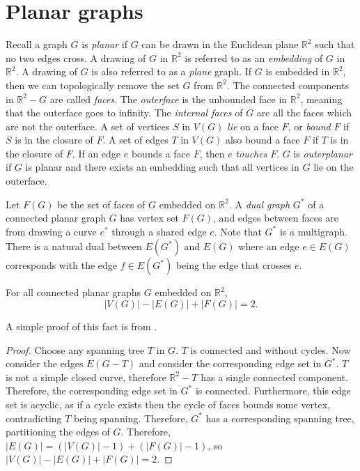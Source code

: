 \section{Planar graphs}\label{sec:Planar graphs}
Recall a graph \(G\) is \textit{planar} if \(G\) can be drawn in the Euclidean plane \( \mathbb{R}^2 \) such that no two edges cross. A drawing of $G$ in $\mathbb{R}^2$ is referred to as an \textit{embedding} of $G$ in $\mathbb{R}^2$. A drawing of $G$ is also referred to as a \textit{plane} graph. If \(G\) is embedded in \(\mathbb{R}^2 \), then we can topologically remove the set $G$ from $\mathbb{R}^2$. The connected components in $\mathbb{R}^2 - G$ are called \textit{faces}. The \textit{outerface} is the unbounded face in $\mathbb{R}^2$, meaning that the outerface goes to infinity. The \textit{internal faces} of $G$ are all the faces which are not the outerface. A set of vertices $S$ in $V(G)$ \textit{lie} on a face $F$, or \textit{bound} $F$ if $S$ is in the closure of $F$. A set of edges $T$ in $V(G)$ also bound a face $F$ if $T$ is in the closure of $F$. If an edge $e$ bounds a face $F$, then $e$ \textit{touches} $F$. \(G\) is \textit{outerplanar} if \(G\) is planar and there exists an embedding such that all vertices in \(G\) lie on the outerface.

Let \(F(G)\) be the set of faces of \(G\) embedded on \(\mathbb{R}^2\). 
A \textit{dual graph} $G^*$ of a connected planar graph $G$ has vertex set $F(G)$, and edges between faces are from drawing a curve $e^*$ through a shared edge $e$. Note that $G^*$ is a multigraph. There is a natural dual between $E(G^*)$ and $E(G)$ where an edge $e \in E(G)$ corresponds with the edge $f \in E(G^*)$ being the edge that crosses $e$. 

\begin{theorem}\label{thm:Euler_planar}
	For all connected planar graphs $G$ embedded on $\mathbb{R}^2$,
	\begin{equation}
		|V(G)| - |E(G)| + |F(G)| = 2.
	\end{equation}
\end{theorem}

A simple proof of this fact is from \textcite{staudtGeometrieLage1847}.

\begin{proof}
	Choose any spanning tree $T$ in $G$. $T$ is connected and without cycles. Now consider the edges $E(G - T)$ and consider the corresponding edge set in $G^*$. $T$ is not a simple closed curve, therefore $\mathbb{R}^2 - T$ has a single connected component. Therefore, the corresponding edge set in $G^*$ is connected. Furthermore, this edge set is acyclic, as if a cycle exists then the cycle of faces bounds some vertex, contradicting $T$ being spanning. Therefore, $G^*$ has a corresponding spanning tree, partitioning the edges of $G$. Therefore, $|E(G)| = (|V(G)| - 1) + (|F(G)| - 1)$, so $|V(G)| - |E(G)| + |F(G)| = 2$. 
\end{proof}

